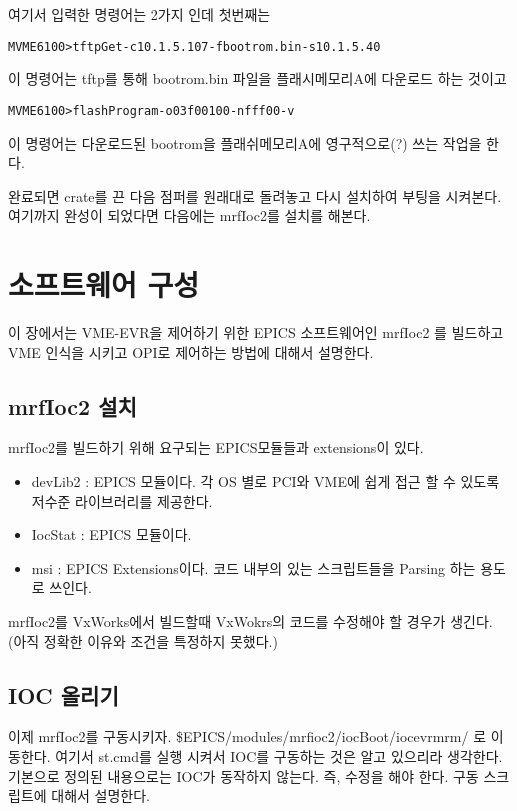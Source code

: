 \documentclass[11pt,a4paper]{article}
\begin{document}
여기서 입력한 명령어는 2가지 인데 첫번째는 
\begin{alltt}
MVME6100> tftpGet -c10.1.5.107 -fbootrom.bin -s10.1.5.40
\end{alltt}
이 명령어는 tftp를 통해 bootrom.bin 파일을 플래시메모리A에 다운로드 하는 것이고
\begin{alltt}
MVME6100> flashProgram -o03f00100 -nfff00 -v 
\end{alltt}
이 명령어는 다운로드된 bootrom을 플래쉬메모리A에 영구적으로(?) 쓰는 작업을 한다.

완료되면 crate를 끈 다음 점퍼를 원래대로 돌려놓고 다시 설치하여 부팅을 시켜본다.
여기까지 완성이 되었다면 다음에는 mrfIoc2를 설치를 해본다.


\section{소프트웨어 구성}
이 장에서는 VME-EVR을 제어하기 위한 EPICS 소프트웨어인 mrfIoc2 를 빌드하고 VME 인식을 시키고
OPI로 제어하는 방법에 대해서 설명한다. 

\subsection{mrfIoc2 설치}
mrfIoc2를 빌드하기 위해 요구되는 EPICS모듈들과 extensions이 있다.
\begin{itemize}
\item devLib2 : EPICS 모듈이다. 각 OS 별로 PCI와 VME에 쉽게 접근 할 수 있도록 저수준 라이브러리를 제공한다.
\item IocStat : EPICS 모듈이다. 
\item msi     : EPICS Extensions이다. 코드 내부의 있는 스크립트들을 Parsing 하는 용도로 쓰인다.
\end{itemize}
mrfIoc2를 VxWorks에서 빌드할때 VxWokrs의 코드를 수정해야 할 경우가 생긴다. (아직 정확한 이유와 조건을 특정하지 못했다.)


\subsection{IOC 올리기}
이제 mrfIoc2를 구동시키자. \$EPICS/modules/mrfioc2/iocBoot/iocevrmrm/ 로 이동한다. 
여기서 st.cmd를 실행 시켜서 IOC를 구동하는 것은 알고 있으리라 생각한다. 기본으로 정의된 내용으로는 IOC가 동작하지 않는다.
즉, 수정을 해야 한다. 구동 스크립트에 대해서 설명한다.

\begin{framed}
\begin{alltt}

\end{alltt}
\end{framed}
\end{document}
